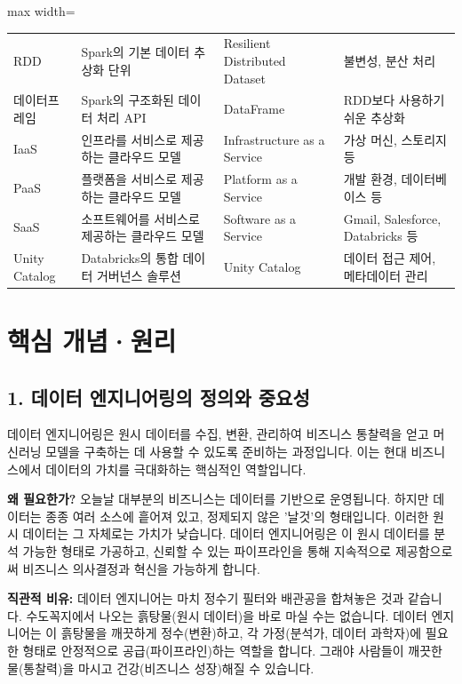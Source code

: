 \documentclass[11pt,a4paper]{article}
\theoremstyle{definition}
\begin{document}
\begin{adjustbox}{max width=\textwidth}
\begin{tabular}{llll}
RDD & Spark의 기본 데이터 추상화 단위 & Resilient Distributed Dataset & 불변성, 분산 처리 \\
데이터프레임 & Spark의 구조화된 데이터 처리 API & DataFrame & RDD보다 사용하기 쉬운 추상화 \\
IaaS & 인프라를 서비스로 제공하는 클라우드 모델 & Infrastructure as a Service & 가상 머신, 스토리지 등 \\
PaaS & 플랫폼을 서비스로 제공하는 클라우드 모델 & Platform as a Service & 개발 환경, 데이터베이스 등 \\
SaaS & 소프트웨어를 서비스로 제공하는 클라우드 모델 & Software as a Service & Gmail, Salesforce, Databricks 등 \\
Unity Catalog & Databricks의 통합 데이터 거버넌스 솔루션 & Unity Catalog & 데이터 접근 제어, 메타데이터 관리 \\
\bottomrule
\end{tabular}
\end{adjustbox}

\newpage

\section*{핵심 개념·원리}

\subsection*{1. 데이터 엔지니어링의 정의와 중요성}

\begin{summarybox}
데이터 엔지니어링은 원시 데이터를 수집, 변환, 관리하여 비즈니스 통찰력을 얻고 머신러닝 모델을 구축하는 데 사용할 수 있도록 준비하는 과정입니다. 이는 현대 비즈니스에서 데이터의 가치를 극대화하는 핵심적인 역할입니다.
\end{summarybox}

\textbf{왜 필요한가?}
오늘날 대부분의 비즈니스는 데이터를 기반으로 운영됩니다. 하지만 데이터는 종종 여러 소스에 흩어져 있고, 정제되지 않은 '날것'의 형태입니다. 이러한 원시 데이터는 그 자체로는 가치가 낮습니다. 데이터 엔지니어링은 이 원시 데이터를 분석 가능한 형태로 가공하고, 신뢰할 수 있는 파이프라인을 통해 지속적으로 제공함으로써 비즈니스 의사결정과 혁신을 가능하게 합니다.

\textbf{직관적 비유:}
데이터 엔지니어는 마치 정수기 필터와 배관공을 합쳐놓은 것과 같습니다.
수도꼭지에서 나오는 흙탕물(원시 데이터)을 바로 마실 수는 없습니다.
데이터 엔지니어는 이 흙탕물을 깨끗하게 정수(변환)하고, 각 가정(분석가, 데이터 과학자)에 필요한 형태로 안정적으로 공급(파이프라인)하는 역할을 합니다. 그래야 사람들이 깨끗한 물(통찰력)을 마시고 건강(비즈니스 성장)해질 수 있습니다.
\end{document}
